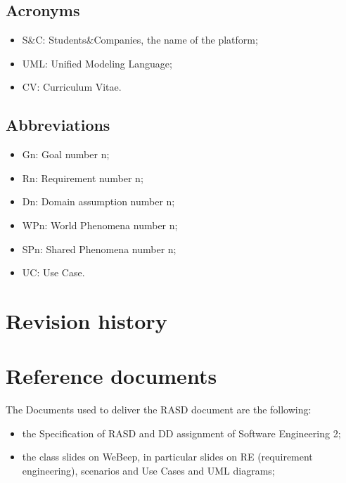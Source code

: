 		\subsection{Acronyms}
			\begin{itemize}
				\item S\&C: Students\&Companies, the name of the platform;
				\item UML: Unified Modeling Language;
				\item CV: Curriculum Vitae.
			\end{itemize}
		\subsection{Abbreviations}
			\begin{itemize}
				\item Gn: Goal number n;
				\item Rn: Requirement number n;
				\item Dn: Domain assumption number n;
				\item WPn: World Phenomena number n;
				\item SPn: Shared Phenomena number n;
				\item UC: Use Case.
			\end{itemize}
	\section{Revision history}
	\section{Reference documents}
		The Documents used to deliver the RASD document are the following:
		\begin{itemize}
			\item the Specification of RASD and DD assignment of Software Engineering 2;
			\item the class slides on WeBeep, in particular slides on RE (requirement engineering), scenarios and Use Cases and UML diagrams;
		\end{itemize}
